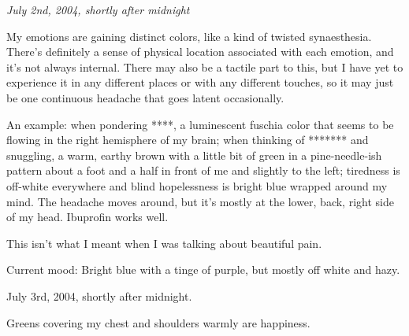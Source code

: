 \label{ally:8}
\begin{paracol}{2}
\begin{rightcolumn*}
  \emph{July 2nd, 2004, shortly after midnight}
\end{rightcolumn*}
\begin{leftcolumn}
My emotions are gaining distinct colors, like a kind of twisted synaesthesia.  There's definitely a sense of physical location associated with each emotion, and it's not always internal.  There may also be a tactile part to this, but I have yet to experience it in any different places or with any different touches, so it may just be one continuous headache that goes latent occasionally.

An example: when pondering ****, a luminescent fuschia color that seems to be flowing in the right hemisphere of my brain; when thinking of ******* and snuggling, a warm, earthy brown with a little bit of green in a pine-needle-ish pattern about a foot and a half in front of me and slightly to the left; tiredness is off-white everywhere and blind hopelessness is bright blue wrapped around my mind.  The headache moves around, but it's mostly at the lower, back, right side of my head.  Ibuprofin works well.

This isn't what I meant when I was talking about beautiful pain.

Current mood: Bright blue with a tinge of purple, but mostly off white and hazy.
\end{leftcolumn}
\end{paracol}


\newpage

\begin{paracol}{2}
\begin{rightcolumn*}
July 3rd, 2004, shortly after midnight.
\end{rightcolumn*}
\begin{leftcolumn}
Greens covering my chest and shoulders warmly are happiness.
\vfill
\end{leftcolumn}
\end{paracol}



